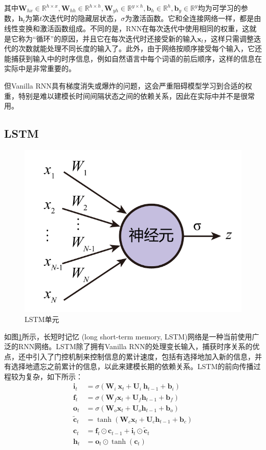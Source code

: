 其中$\bm{W}_{hx}\in\mathbb{R}^{h\times x},\bm{W}_{hh}\in\mathbb{R}^{h\times h},\bm{W}_{yh}\in\mathbb{R}^{y\times h},\bm{b}_h\in\mathbb{R}^h,\bm{b}_y\in\mathbb{R}^y$均为可学习的参数，$\bm{h}_t$为第$t$次迭代时的隐藏层状态，$\sigma$为激活函数。它和全连接网络一样，都是由线性变换和激活函数组成。不同的是，RNN在每次迭代中使用相同的权重，这就是它称为“循环”的原因，并且它在每次迭代时还接受新的输入$\bm{x}_t$，这样只需调整迭代的次数就能处理不同长度的输入了。此外，由于网络按顺序接受每个输入，它还能捕获到输入中的时序信息，例如自然语言中每个词语的前后顺序，这样的信息在实际中是非常重要的。

但Vanilla RNN具有梯度消失或爆炸的问题，这会严重阻碍模型学习到合适的权重，特别是难以建模长时间间隔状态之间的依赖关系，因此在实际中并不是很常用。

\subsection{LSTM}

\begin{figure}
    \centering
    \includegraphics[page=4,width=\linewidth]{figure/figures.pdf}
    \caption{LSTM单元}
    \label{lstm}
\end{figure}

如图\ref{lstm}所示，长短时记忆 (long short-term memory, LSTM)\cite{lstm97}网络是一种当前使用广泛的RNN网络。LSTM除了拥有Vanilla RNN的处理变长输入，捕获时序关系的优点，还中引入了门控机制来控制信息的累计速度，包括有选择地加入新的信息，并有选择地遗忘之前累计的信息，以此来建模长期的依赖关系。LSTM的前向传播过程较为复杂，如下所示：
\begin{align}
\bm{i}_t&=\sigma\left(\bm{W}_i\ \bm{x}_t+\bm{U}_i\ \bm{h}_{t-1}+\bm{b}_i\right)\\
\bm{f}_t&=\sigma\left(\bm{W}_f\bm{x}_t+\bm{U}_f\bm{h}_{t-1}+\bm{b}_f\right)\\
\bm{o}_t&=\sigma\left(\bm{W}_o\bm{x}_t+\bm{U}_o\bm{h}_{t-1}+\bm{b}_o\right)\\
{\widetilde{\bm{c}}}_t&=\tanh{\left(\bm{W}_c\bm{x}_t+\bm{U}_c\bm{h}_{t-1}+\bm{b}_c\right)}\\
\bm{c}_t&=\bm{f}_t\odot\bm{c}_{t-1}+\bm{i}_t\odot{\widetilde{\bm{c}}}_t\\
\bm{h}_t&=\bm{o}_t\odot\tanh{\left(\bm{c}_t\right)}
\end{align}

